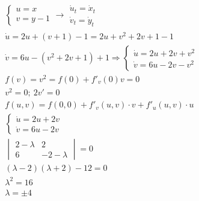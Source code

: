 \documentclass{article}
\begin{document}
\begin{fleqn}[1\parindent]
\begin{gather*}
\begin{cases}
      u=x \\ 
      v=y-1
    \end{cases} \rightarrow
    \begin{matrix}
      \dot{u}_t=\dot{x}_t\\ 
      \dot{v}_t=\dot{y}_t
    \end{matrix} \\ 
    \dot{u} = 2u+(v+1)-1=2u+v^2+2v+1-1 \\ 
    \dot{v} = 6u-(v^2+2v+1)+1 \Rightarrow 
    \begin{cases}
      \dot{u}=2u+2v+v^2 \\ 
      \dot{v}=6u-2v-v^2
    \end{cases} \\ 
    f(v) = v^2 = f(0)+f'_v(0)v=0 \\ 
    v^2 = 0;\ 2v' = 0 \\ 
    f(u,v)=f(0,0)+f'_v(u,v)\cdot v+f'_u(u,v)\cdot u \\
    \begin{cases}
      \dot{u} = 2u+2v \\ 
      \dot{v} = 6u-2v
    \end{cases} \\ 
    \begin{vmatrix}
      2-\lambda & 2 \\ 
      6 & -2-\lambda
    \end{vmatrix} = 0 \\ 
    (\lambda-2)(\lambda+2)-12=0 \\ 
    \lambda^2=16 \\ 
    \lambda = \pm 4 \\ 
  \end{gather*}
\end{fleqn}
\end{document}
